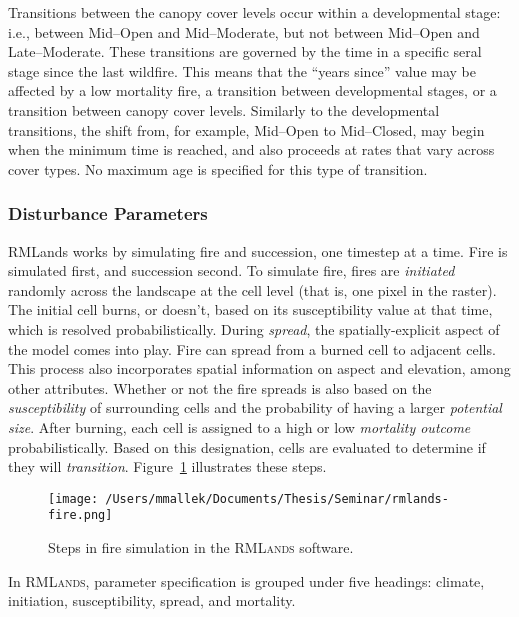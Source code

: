 Transitions between the canopy cover levels occur within a developmental stage: i.e., between Mid--Open and Mid--Moderate, but not between Mid--Open and Late--Moderate. These transitions are governed by the time in a specific seral stage since the last wildfire. This means that the ``years since'' value may be affected by a low mortality fire, a transition between developmental stages, or a transition between canopy cover levels. Similarly to the developmental transitions, the shift from, for example, Mid--Open to Mid--Closed, may begin when the minimum time is reached, and also proceeds at rates that vary across cover types. No maximum age is specified for this type of transition.

\subsubsection*{Disturbance Parameters} 
\label{subsubsec:distparams}

RMLands works by simulating fire and succession, one timestep at a time. Fire is simulated first, and succession second. To simulate fire, fires are \emph{initiated} randomly across the landscape at the cell level (that is, one pixel in the raster). The initial cell burns, or doesn't, based on its susceptibility value at that time, which is resolved probabilistically. During \emph{spread},  the spatially-explicit aspect of the model comes into play. Fire can spread from a burned cell to adjacent cells. This process also incorporates spatial information on aspect and elevation, among other attributes. Whether or not the fire spreads is also based on the \emph{susceptibility} of surrounding cells and the probability of having a larger \emph{potential size}. After burning, each cell is assigned to a high or low \emph{mortality outcome} probabilistically. Based on this designation, cells are evaluated to determine if they will \emph{transition}. Figure~\ref{fig:rmlands-fire-steps} illustrates these steps.

\begin{figure}[htbp]
\centering
\texttt{[image: /Users/mmallek/Documents/Thesis/Seminar/rmlands-fire.png]}
\caption{Steps in fire simulation in the \textsc{RMLands} software.} 
\label{fig:rmlands-fire-steps}
\end{figure}

In \textsc{RMLands}, parameter specification is grouped under five headings: climate, initiation, susceptibility, spread, and mortality.


